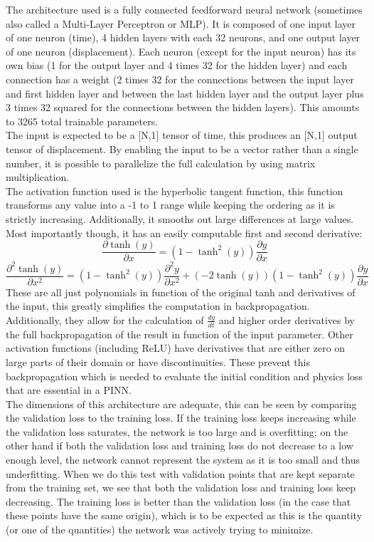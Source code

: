 \documentclass[12pt, a4paper]{report}
\newcommand{\pd}[2]{\frac{\partial #1}{\partial #2}}
\newcommand{\pdd}[2]{\frac{\partial^2 #1}{\partial #2^2}}
\begin{document}
The architecture used is a fully connected feedforward neural network (sometimes also called a Multi-Layer Perceptron or MLP). It is composed of one input layer of one neuron (time), 4 hidden layers with each 32 neurons, and one output layer of one neuron (displacement). Each neuron (except for the input neuron) has its own bias (1 for the output layer and 4 times 32 for the hidden layer) and each connection has a weight (2 times 32 for the connections between the input layer and first hidden layer and between the last hidden layer and the output layer plus 3 times 32 squared for the connections between the hidden layers). This amounts to 3265 total trainable parameters. \\
The input is expected to be a [N,1] tensor of time, this produces an [N,1] output tensor of displacement. By enabling the input to be a vector rather than a single number, it is possible to parallelize the full calculation by using matrix multiplication.\\
The activation function used is the hyperbolic tangent function, this function transforms any value into a -1 to 1 range while keeping the ordering as it is strictly increasing. Additionally, it smooths out large differences at large values. Most importantly though, it has an easily computable first and second derivative:
\[ 
\pd{\tanh(y)}{x} = (1-\tanh^2(y))\pd{y}{x} 
\]
\[
\pdd{\tanh(y)}{x} = (1-\tanh^2(y))\pdd{y}{x} + (-2\tanh(y))(1-\tanh^2(y))\pd{y}{x}
\]
These are all just polynomials in function of the original tanh and derivatives of the input, this greatly simplifies the computation in backpropagation. Additionally, they allow for the calculation of $\frac{dy}{dt}$ and higher order derivatives by the full backpropagation of the result in function of the input parameter. Other activation functions (including ReLU) have derivatives that are either zero on large parts of their domain or have discontinuities. These prevent this backpropagation which is needed to evaluate the initial condition and physics loss that are essential in a PINN.\\
The dimensions of this architecture are adequate, this can be seen by comparing the validation loss to the training loss. If the training loss keeps increasing while the validation loss saturates, the network is too large and is overfitting; on the other hand if both the validation loss and training loss do not decrease to a low enough level, the network cannot represent the system as it is too small and thus underfitting. When we do this test with validation points that are kept separate from the training set, we see that both the validation loss and training loss keep decreasing. The training loss is better than the validation loss (in the case that these points have the same origin), which is to be expected as this is the quantity (or one of the quantities) the network was actively trying to minimize.\\
\end{document}
